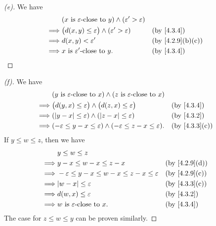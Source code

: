 \begin{proof}[(e)]
  We have
  \begin{align*}
             & (x \text{ is \(\varepsilon\)-close to } y) \land (\varepsilon' > \varepsilon)                      \\
    \implies & \big(d(x, y) \leq \varepsilon\big) \land (\varepsilon' > \varepsilon)         &  & \by{4.3.4}      \\
    \implies & d(x, y) < \varepsilon'                                                        &  & \by{4.2.9}[b,c] \\
    \implies & x \text{ is \(\varepsilon'\)-close to } y.                                    &  & \by{4.3.4}
  \end{align*}
\end{proof}

\begin{proof}[(f)]
  We have
  \begin{align*}
             & (y \text{ is } \varepsilon\text{-close to } x) \land (z \text{ is } \varepsilon\text{-close to } x)                    \\
    \implies & \big(d(y, x) \leq \varepsilon\big) \land \big(d(z, x) \leq \varepsilon\big)                         &  & \by{4.3.4}    \\
    \implies & (\abs{y - x} \leq \varepsilon) \land (\abs{z - x} \leq \varepsilon)                                 &  & \by{4.3.2}    \\
    \implies & (-\varepsilon \leq y - x \leq \varepsilon) \land (-\varepsilon \leq z - x \leq \varepsilon).        &  & \by{4.3.3}[c]
  \end{align*}
  If \(y \leq w \leq z\), then we have
  \begin{align*}
             & y \leq w \leq z                                                                   \\
    \implies & y - x \leq w - x \leq z - x                                    &  & \by{4.2.9}[d] \\
    \implies & -\varepsilon \leq y - x \leq w - x \leq z - x \leq \varepsilon &  & \by{4.2.9}[c] \\
    \implies & \abs{w - x} \leq \varepsilon                                   &  & \by{4.3.3}[c] \\
    \implies & d(w, x) \leq \varepsilon                                       &  & \by{4.3.2}    \\
    \implies & w \text{ is } \varepsilon\text{-close to } x.                  &  & \by{4.3.4}
  \end{align*}
  The case for \(z \leq w \leq y\) can be proven similarly.
\end{proof}

